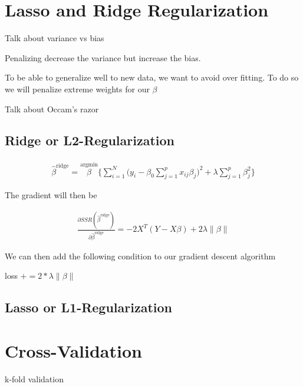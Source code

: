 \documentclass[conference]{IEEEtran}
\begin{document}
\section{Lasso and Ridge Regularization}

Talk about variance vs bias

Penalizing decrease the variance but increase the bias.

\cite{bishop2006pattern}

To be able to generalize well to new data, we want to avoid over fitting. To do
so we will penalize extreme weights for our $\beta$

Talk about Occam's razor

\subsection{Ridge or L2-Regularization}

\begin{eqnarray}
  \hat{\beta}^{\text{ridge}} = \stackrel{\text{argmin}}{\beta}
\Bigg\{ \sum_{i=1}^N \bigg(y_i - \beta_0 \sum_{j=1}^p x_{ij} \beta_j \bigg)^2 +
\lambda \sum_{j=1}^p \beta_j^2 \Bigg\}
\end{eqnarray}
\cite{hastie2005elements}

The gradient will then be 

\begin{eqnarray}
  \frac{\partial SSR(\hat{\beta}^{\text{ridge}} )}{\partial
  \hat{\beta}^{\text{ridge}}} = -2 X^T (Y-X \beta) + 2 \lambda \| \beta \|
\end{eqnarray}

We can then add the following condition to our gradient descent algorithm

\begin{algorithmic}
\State loss $+= 2 * \lambda \| \beta \|$
\EndIf
\end{algorithmic}

\subsection{Lasso or L1-Regularization}

\cite{scikit-learn}
\cite{hastie2005elements}

\section{Cross-Validation}

k-fold validation
\end{document}
